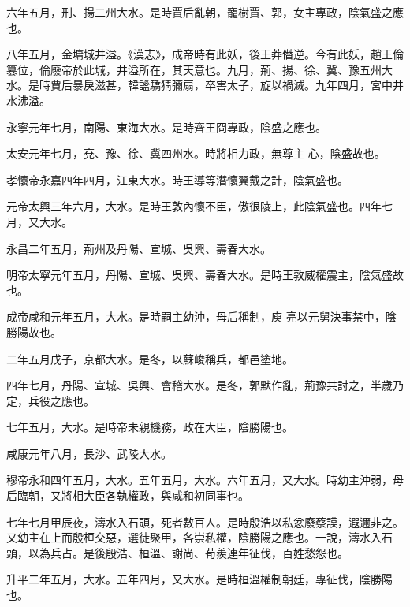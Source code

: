 \begin{pinyinscope}
 六年五月，刑、揚二州大水。是時賈后亂朝，寵樹賈、郭，女主專政，陰氣盛之應也。



 八年五月，金墉城井溢。《漢志》，成帝時有此妖，後王莽僭逆。今有此妖，趙王倫篡位，倫廢帝於此城，井溢所在，其天意也。九月，荊、揚、徐、冀、豫五州大水。是時賈后暴戾滋甚，韓謐驕猜彌扇，卒害太子，旋以禍滅。九年四月，宮中井水沸溢。



 永寧元年七月，南陽、東海大水。是時齊王冏專政，陰盛之應也。



 太安元年七月，兗、豫、徐、冀四州水。時將相力政，無尊主
 心，陰盛故也。



 孝懷帝永嘉四年四月，江東大水。時王導等潛懷翼戴之計，陰氣盛也。



 元帝太興三年六月，大水。是時王敦內懷不臣，傲很陵上，此陰氣盛也。四年七月，又大水。



 永昌二年五月，荊州及丹陽、宣城、吳興、壽春大水。



 明帝太寧元年五月，丹陽、宣城、吳興、壽春大水。是時王敦威權震主，陰氣盛故也。



 成帝咸和元年五月，大水。是時嗣主幼沖，母后稱制，庾
 亮以元舅決事禁中，陰勝陽故也。



 二年五月戊子，京都大水。是冬，以蘇峻稱兵，都邑塗地。



 四年七月，丹陽、宣城、吳興、會稽大水。是冬，郭默作亂，荊豫共討之，半歲乃定，兵役之應也。



 七年五月，大水。是時帝未親機務，政在大臣，陰勝陽也。



 咸康元年八月，長沙、武陵大水。



 穆帝永和四年五月，大水。五年五月，大水。六年五月，又大水。時幼主沖弱，母后臨朝，又將相大臣各執權政，與咸和初同事也。



 七年七月甲辰夜，濤水入石頭，死者數百人。是時殷浩以私忿廢蔡謨，遐邇非之。又幼主在上而殷桓交惡，選徒聚甲，各崇私權，陰勝陽之應也。一說，濤水入石頭，以為兵占。是後殷浩、桓溫、謝尚、荀羨連年征伐，百姓愁怨也。



 升平二年五月，大水。五年四月，又大水。是時桓溫權制朝廷，專征伐，陰勝陽也。




\end{pinyinscope}
